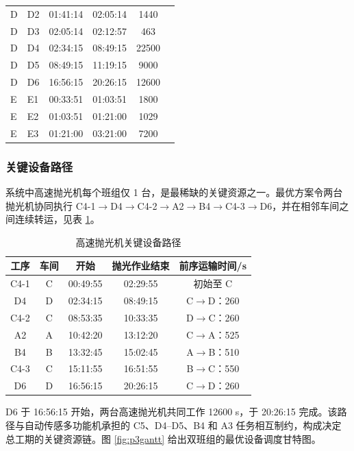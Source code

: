 \documentclass[12pt,a4paper]{article}
\begin{document}
\begin{table}[H]
\begin{tabular}{llcccc}
D & D2 & 01:41:14 & 02:05:14 & 1440 \\
D & D3 & 02:05:14 & 02:12:57 & 463 \\
D & D4 & 02:34:15 & 08:49:15 & 22500 \\
D & D5 & 08:49:15 & 11:19:15 & 9000 \\
D & D6 & 16:56:15 & 20:26:15 & 12600 \\
\midrule
E & E1 & 00:33:51 & 01:03:51 & 1800 \\
E & E2 & 01:03:51 & 01:21:00 & 1029 \\
E & E3 & 01:21:00 & 03:21:00 & 7200 \\
\bottomrule
\end{tabular}
\end{table}

\subsubsection{关键设备路径}

系统中高速抛光机每个班组仅 1 台，是最稀缺的关键资源之一。最优方案令两台抛光机协同执行 C4-1$\to$D4$\to$C4-2$\to$A2$\to$B4$\to$C4-3$\to$D6，并在相邻车间之间连续转运，见表 \ref{tab:p3critical}。

\begin{table}[H]
\centering
\caption{高速抛光机关键设备路径}
\small
\label{tab:p3critical}
\begin{tabular}{ccccc}
\toprule
工序 & 车间 & 开始 & 抛光作业结束 & 前序运输时间/s \\
\midrule
C4-1 & C & 00:49:55 & 02:29:55 & 初始至 C \\
D4 & D & 02:34:15 & 08:49:15 & C$\to$D：260 \\
C4-2 & C & 08:53:35 & 10:33:35 & D$\to$C：260 \\
A2 & A & 10:42:20 & 13:12:20 & C$\to$A：525 \\
B4 & B & 13:32:45 & 15:02:45 & A$\to$B：510 \\
C4-3 & C & 15:11:55 & 16:51:55 & B$\to$C：550 \\
D6 & D & 16:56:15 & 20:26:15 & C$\to$D：260 \\
\bottomrule
\end{tabular}
\end{table}

D6 于 16:56:15 开始，两台高速抛光机共同工作 12600 s，于 20:26:15 完成。该路径与自动传感多功能机承担的 C5、D4--D5、B4 和 A3 任务相互制约，构成决定总工期的关键资源链。图 \ref{fig:p3gantt} 给出双班组的最优设备调度甘特图。
\end{document}
